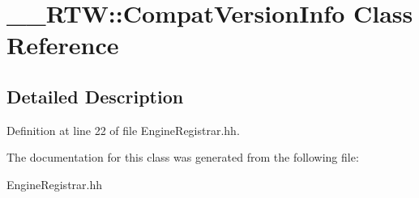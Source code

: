 \section{\_\-\_\-RTW::CompatVersionInfo Class Reference}
\label{class____RTW_1_1CompatVersionInfo}


\subsection{Detailed Description}


Definition at line 22 of file EngineRegistrar.hh.

The documentation for this class was generated from the following file:\begin{DoxyCompactItemize}
\item 
EngineRegistrar.hh\end{DoxyCompactItemize}
